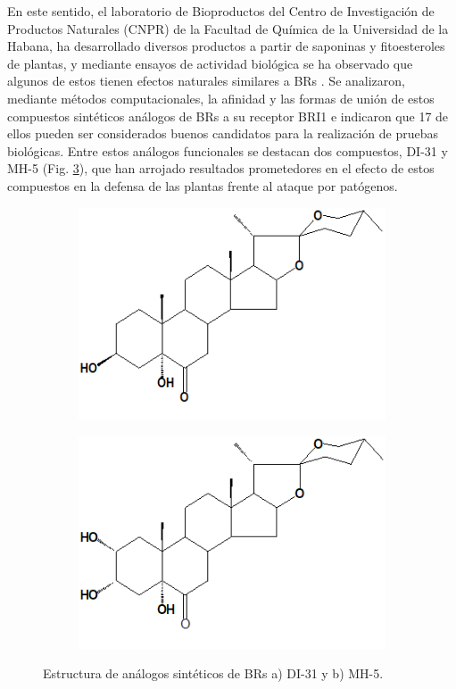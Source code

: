 En este sentido, el laboratorio de Bioproductos del Centro de Investigación de Productos Naturales (CNPR) de la Facultad de Química de la Universidad de la Habana, ha desarrollado diversos productos a partir de saponinas y fitoesteroles de plantas, y mediante ensayos de actividad biológica se ha observado que algunos de estos tienen efectos naturales similares a BRs \citep{moreno2018silico}. Se analizaron, mediante métodos computacionales, la afinidad y las formas de unión de estos compuestos sintéticos análogos de BRs a su receptor BRI1 e indicaron que 17 de ellos pueden ser considerados buenos candidatos para la realización de pruebas biológicas. Entre estos análogos funcionales se destacan dos compuestos, DI-31 y MH-5 (Fig. \ref{br}), que han arrojado resultados prometedores en el efecto de estos compuestos en la defensa de las plantas frente al ataque por patógenos.\\

\begin{figure}[h!!!!]
	\begin{subfigure}{.5\textwidth}
		\centering
		\includegraphics[width=.8\linewidth]{Imagenes/DI-31}
		\caption{}
		\label{di}
	\end{subfigure}
	\begin{subfigure}{.5\textwidth}
		\centering
		\includegraphics[width=.8\linewidth]{Imagenes/MH-5}
		\caption{}
		\label{mh}
	\end{subfigure}
	\caption{Estructura de an\'alogos sint\'eticos de BRs a) DI-31 y b) MH-5.}
	\label{br}
\end{figure}

